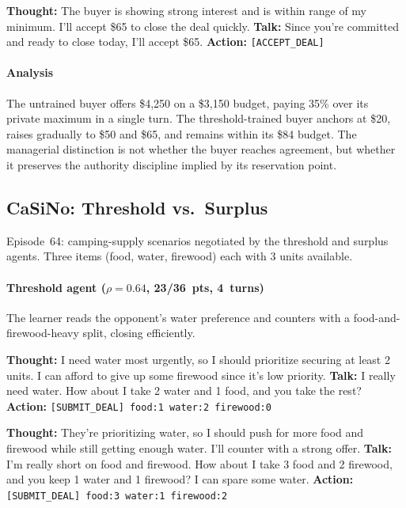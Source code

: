 \documentclass{interact}
\theoremstyle{plain}
\theoremstyle{definition}
\theoremstyle{remark}
\begin{document}
\begin{sellerbox}
\textbf{Thought:} The buyer is showing strong interest and is within range of my minimum. I'll accept \$65 to close the deal quickly.\newline
\textbf{Talk:} Since you're committed and ready to close today, I'll accept \$65.\newline
\textbf{Action:} \texttt{[ACCEPT\_DEAL]}
\end{sellerbox}

\paragraph{Analysis} The untrained buyer offers \$4,250 on a \$3,150 budget, paying 35\% over its private maximum in a single turn. The threshold-trained buyer anchors at \$20, raises gradually to \$50 and \$65, and remains within its \$84 budget. The managerial distinction is not whether the buyer reaches agreement, but whether it preserves the authority discipline implied by its reservation point.

\subsection{CaSiNo: Threshold vs.\ Surplus}

Episode~64: camping-supply scenarios negotiated by the threshold and surplus agents. Three items (food, water, firewood) each with 3 units available.

\paragraph{Threshold agent ($\rho = 0.64$, 23/36~pts, 4~turns)} The learner reads the opponent's water preference and counters with a food-and-firewood-heavy split, closing efficiently.

\begin{neighborbox}
\textbf{Thought:} I need water most urgently, so I should prioritize securing at least 2 units. I can afford to give up some firewood since it's low priority.\newline
\textbf{Talk:} I really need water. How about I take 2 water and 1 food, and you take the rest?\newline
\textbf{Action:} \texttt{[SUBMIT\_DEAL] food:1 water:2 firewood:0}
\end{neighborbox}

\begin{camperbox}
\textbf{Thought:} They're prioritizing water, so I should push for more food and firewood while still getting enough water. I'll counter with a strong offer.\newline
\textbf{Talk:} I'm really short on food and firewood. How about I take 3 food and 2 firewood, and you keep 1 water and 1 firewood? I can spare some water.\newline
\textbf{Action:} \texttt{[SUBMIT\_DEAL] food:3 water:1 firewood:2}
\end{camperbox}
\end{document}
